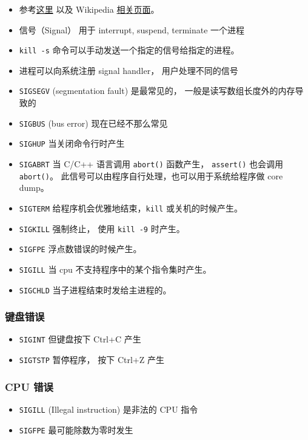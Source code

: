 
\begin{issues}
\issueDraft
\end{issues}

\begin{itemize}
\item 参考\href{https://unix.stackexchange.com/questions/6332/what-causes-various-signals-to-be-sent}{这里} 以及 Wikipedia \href{https://en.wikipedia.org/wiki/Signal_(IPC)}{相关页面}。
\item 信号（Signal） 用于 interrupt, suspend, terminate 一个进程
\item \verb`kill -s` 命令可以手动发送一个指定的信号给指定的进程。
\item 进程可以向系统注册 signal handler， 用户处理不同的信号
\item \verb`SIGSEGV` (segmentation fault) 是最常见的， 一般是读写数组长度外的内存导致的
\item \verb`SIGBUS` (bus error) 现在已经不那么常见
\item \verb`SIGHUP` 当关闭命令行时产生
\item \verb`SIGABRT` 当 C/C++ 语言调用 \verb`abort()` 函数产生， \verb`assert()` 也会调用 \verb`abort()`。 此信号可以由程序自行处理，也可以用于系统给程序做 core dump。
\item \verb`SIGTERM` 给程序机会优雅地结束，\verb`kill` 或关机的时候产生。
\item \verb`SIGKILL` 强制终止， 使用 \verb`kill -9` 时产生。
\item \verb`SIGFPE` 浮点数错误的时候产生。
\item \verb`SIGILL` 当 cpu 不支持程序中的某个指令集时产生。
\item \verb`SIGCHLD` 当子进程结束时发给主进程的。
\end{itemize}

\subsubsection{键盘错误}
\begin{itemize}
\item \verb`SIGINT` 但键盘按下 Ctrl+C 产生
\item \verb`SIGTSTP` 暂停程序， 按下 Ctrl+Z 产生
\end{itemize}

\subsubsection{CPU 错误}
\begin{itemize}
\item \verb`SIGILL` (Illegal instruction) 是非法的 CPU 指令
\item \verb`SIGFPE` 最可能除数为零时发生
\end{itemize}
